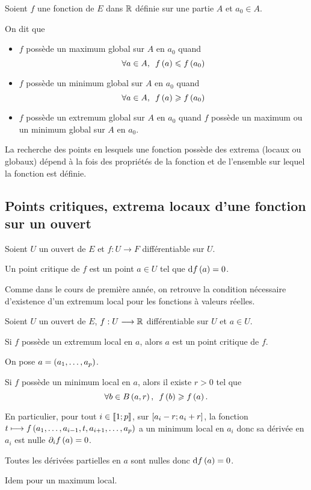 \begin{defi}
Soient \(f\) une fonction de \(E\) dans \(\mathbb{R}\) définie sur une partie \(A\) et \(a_0\in A\).

On dit que

\begin{itemize}
    \item \(f\) possède un maximum global sur \(A\) en \(a_0\) quand \[\quantifs{\forall a\in A}f\paren{a}\leq f\paren{a_0}\]
    \item \(f\) possède un minimum global sur \(A\) en \(a_0\) quand \[\quantifs{\forall a\in A}f\paren{a}\geq f\paren{a_0}\]
    \item \(f\) possède un extremum global sur \(A\) en \(a_0\) quand \(f\) possède un maximum ou un minimum global sur \(A\) en \(a_0\).
\end{itemize}
\end{defi}

La recherche des points en lesquels une fonction possède des extrema (locaux ou globaux) dépend à la fois des propriétés de la fonction et de l'ensemble sur lequel la fonction est définie.

\subsection{Points critiques, extrema locaux d'une fonction sur un ouvert}

\begin{defi}
Soient \(U\) un ouvert de \(E\) et \(f:U\to F\) différentiable sur \(U\).

Un point critique de \(f\) est un point \(a\in U\) tel que \(\odif{f}\paren{a}=0\).
\end{defi}

Comme dans le cours de première année, on retrouve la condition nécessaire d'existence d'un extremum local pour les fonctions à valeurs réelles.

\begin{prop}
Soient \(U\) un ouvert de \(E\), \(f:U\longrightarrow\mathbb{R}\) différentiable sur \(U\) et \(a\in U\).

Si \(f\) possède un extremum local en \(a\), alors \(a\) est un point critique de \(f\).
\end{prop}

\begin{dem}
On pose \(a=\left(a_1,\dots,a_p\right)\).

Si \(f\) possède un minimum local en \(a\), alors il existe \(r>0\) tel que \[\quantifs{\forall b\in\bouleo{a}{r}}f\paren{b}\geq f\paren{a}.\]

En particulier, pour tout \(i\in\left\llbracket1;p\right\rrbracket\), sur \(\left[a_i-r;a_i+r\right]\), la fonction \(t\longmapsto f\left(a_1,\dots,a_{i-1},t,a_{i+1},\dots,a_p\right)\) a un minimum local en \(a_i\) donc sa dérivée en \(a_i\) est nulle \ie \(\pdif{i}f\paren{a}=0\).

Toutes les dérivées partielles en \(a\) sont nulles donc \(\odif{f}\paren{a}=0\).

Idem pour un maximum local.
\end{dem}

